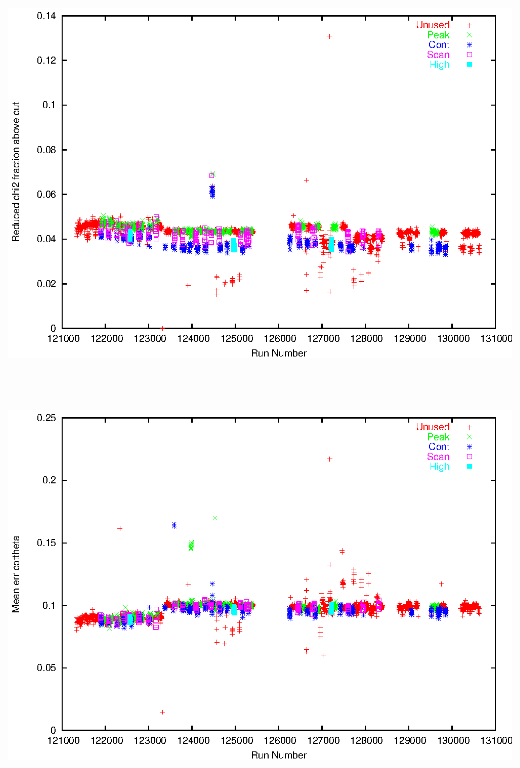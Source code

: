 \documentclass[12pt]{article}
\begin{document}
\mbox{ }

\vfill
\includegraphics[height=0.9\linewidth, angle=90]{fracredchi.eps}

\vfill
\pagebreak

\mbox{ }

\vfill
\includegraphics[height=0.9\linewidth, angle=90]{meanerrcotth.eps}

\vfill
\pagebreak
\end{document}
